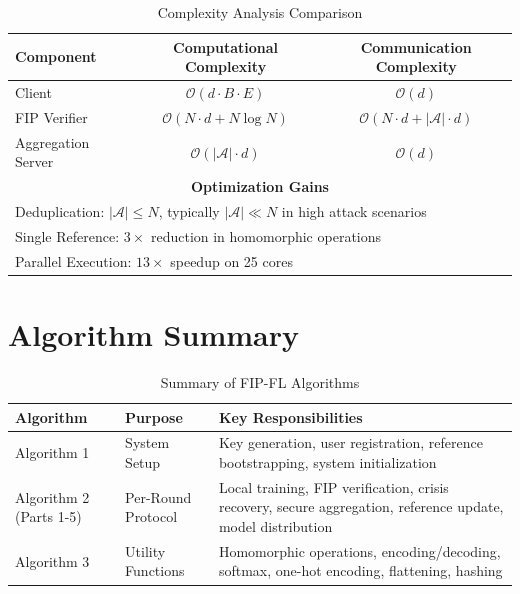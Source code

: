\documentclass[10pt,journal,compsoc]{IEEEtran}
\begin{document}
\begin{table}[H]
\caption{Complexity Analysis Comparison}
\label{tab:complexity}
\begin{center}
\begin{tabular}{@{}lcc@{}}
\toprule
\textbf{Component} & \textbf{Computational Complexity} & \textbf{Communication Complexity} \\
\midrule
Client & $\mathcal{O}(d \cdot B \cdot E)$ & $\mathcal{O}(d)$ \\
FIP Verifier & $\mathcal{O}(N \cdot d + N \log N)$ & $\mathcal{O}(N \cdot d + |\mathcal{A}| \cdot d)$ \\
Aggregation Server & $\mathcal{O}(|\mathcal{A}| \cdot d)$ & $\mathcal{O}(d)$ \\
\midrule
\multicolumn{3}{c}{\textbf{Optimization Gains}} \\
\midrule
\multicolumn{3}{p{0.8\textwidth}}{Deduplication: $|\mathcal{A}| \leq N$, typically $|\mathcal{A}| \ll N$ in high attack scenarios} \\
\multicolumn{3}{p{0.8\textwidth}}{Single Reference: $3\times$ reduction in homomorphic operations} \\
\multicolumn{3}{p{0.8\textwidth}}{Parallel Execution: $13\times$ speedup on 25 cores} \\
\bottomrule
\end{tabular}
\end{center}
\end{table}

\section{Algorithm Summary}
\label{sec:summary}

\begin{table}[H]
\caption{Summary of FIP-FL Algorithms}
\label{tab:summary}
\begin{center}
\begin{tabular}{@{}p{2.5cm}p{4cm}p{6cm}@{}}
\toprule
\textbf{Algorithm} & \textbf{Purpose} & \textbf{Key Responsibilities} \\
\midrule
Algorithm 1 & System Setup & Key generation, user registration, reference bootstrapping, system initialization \\
\midrule
Algorithm 2 (Parts 1-5) & Per-Round Protocol & Local training, FIP verification, crisis recovery, secure aggregation, reference update, model distribution \\
\midrule
Algorithm 3 & Utility Functions & Homomorphic operations, encoding/decoding, softmax, one-hot encoding, flattening, hashing \\
\bottomrule
\end{tabular}
\end{center}
\end{table}
\end{document}

